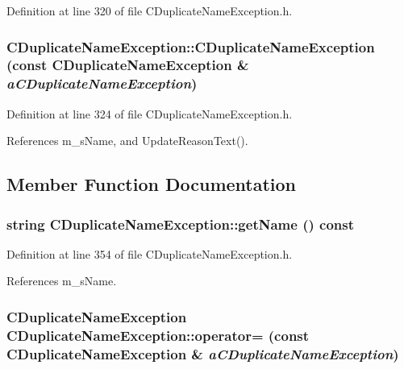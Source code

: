 Definition at line 320 of file CDuplicate\-Name\-Exception.h.
\subsubsection{\setlength{\rightskip}{0pt plus 5cm}CDuplicate\-Name\-Exception::CDuplicate\-Name\-Exception (const CDuplicate\-Name\-Exception \& {\em a\-CDuplicate\-Name\-Exception})\hspace{0.3cm}{\tt  [inline]}}\label{classCDuplicateNameException_a5}




Definition at line 324 of file CDuplicate\-Name\-Exception.h.

References m\_\-s\-Name, and Update\-Reason\-Text().

\subsection{Member Function Documentation}
\subsubsection{\setlength{\rightskip}{0pt plus 5cm}string CDuplicate\-Name\-Exception::get\-Name () const\hspace{0.3cm}{\tt  [inline]}}\label{classCDuplicateNameException_a8}




Definition at line 354 of file CDuplicate\-Name\-Exception.h.

References m\_\-s\-Name.
\subsubsection{\setlength{\rightskip}{0pt plus 5cm}CDuplicate\-Name\-Exception CDuplicate\-Name\-Exception::operator= (const CDuplicate\-Name\-Exception \& {\em a\-CDuplicate\-Name\-Exception})\hspace{0.3cm}{\tt  [inline]}}\label{classCDuplicateNameException_a6}




